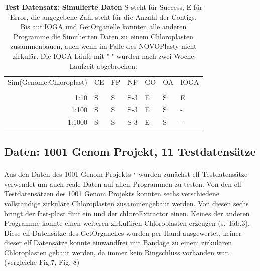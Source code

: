 \documentclass{scrartcl}
\begin{document}
\begin{table}[!h]
\caption[Test Datensatz: Simulierte Daten]{\textbf{Test Datensatz: Simulierte Daten} S steht für Success, E für Error, die angegebene Zahl steht für die Anzahl der Contigs. Bis auf IOGA und GetOrganelle konnten alle anderen Programme die Simulierten Daten zu einem Chloroplasten zusammenbauen, auch wenn im Falle des NOVOPlasty nicht zirkulär. Die IOGA Läufe mit "-" wurden nach zwei Woche Laufzeit abgebrochen.}
\begin{center}
\begin{tabular}{rllllll}
Sim(Genome:Chloroplast) & CE & FP & NP & GO & OA & IOGA\\
 &  &  &  &  &  & \\
\hline
1:10 & S & S & S-3 & E & S & E\\
1:100 & S & S & S-3 & E & S & -\\
1:1000 & S & S & S-3 & E & S & -\\
\end{tabular}
\end{center}
\end{table}

\subsection{Daten: 1001 Genom Projekt, 11 Testdatensätze}
\label{sec-4-3}
Aus den Daten des 1001 Genom Projekts \footnotemark[38]{}\textsuperscript{,}\,\footnotemark[7]{} wurden zunächst elf Testdatensätze verwendet um auch reale Daten auf allen Programmen zu testen.
Von den elf Testdatensätzen des 1001 Genom Projekts konnten sechs verschiedene vollständige zirkuläre Chloroplasten zusammengebaut werden. Von diesen
sechs bringt der fast-plast fünf ein und der chloroExtractor einen. Keines der anderen Programme konnte einen weiteren 
zirkulären Chloroplasten erzeugen (s. Tab.3). Diese elf Datensätze des GetOrganelles wurden per Hand ausgewertet, keiner dieser elf Datensätze konnte einwandfrei mit Bandage
zu einem zirkulären Chloroplasten gebaut werden, da immer kein Ringschluss vorhanden war. (vergleiche Fig.7, Fig. 8)
\end{document}
